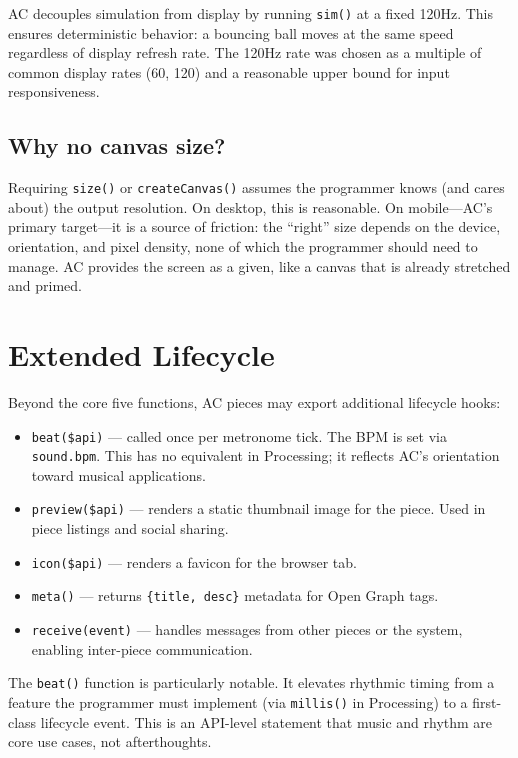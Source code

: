 \documentclass[10pt,letterpaper,twocolumn]{article}
\begin{document}
AC decouples simulation from display by running \texttt{sim()} at a fixed 120Hz. This ensures deterministic behavior: a bouncing ball moves at the same speed regardless of display refresh rate. The 120Hz rate was chosen as a multiple of common display rates (60, 120) and a reasonable upper bound for input responsiveness.

\subsection{Why no canvas size?}

Requiring \texttt{size()} or \texttt{createCanvas()} assumes the programmer knows (and cares about) the output resolution. On desktop, this is reasonable. On mobile---AC's primary target---it is a source of friction: the ``right'' size depends on the device, orientation, and pixel density, none of which the programmer should need to manage. AC provides the screen as a given, like a canvas that is already stretched and primed.


\section{Extended Lifecycle}
\label{sec:extended}

Beyond the core five functions, AC pieces may export additional lifecycle hooks:

\begin{itemize}
  \item \texttt{beat(\$api)} --- called once per metronome tick. The BPM is set via \texttt{sound.bpm}. This has no equivalent in Processing; it reflects AC's orientation toward musical applications.
  \item \texttt{preview(\$api)} --- renders a static thumbnail image for the piece. Used in piece listings and social sharing.
  \item \texttt{icon(\$api)} --- renders a favicon for the browser tab.
  \item \texttt{meta()} --- returns \texttt{\{title, desc\}} metadata for Open Graph tags.
  \item \texttt{receive(event)} --- handles messages from other pieces or the system, enabling inter-piece communication.
\end{itemize}

The \texttt{beat()} function is particularly notable. It elevates rhythmic timing from a feature the programmer must implement (via \texttt{millis()} in Processing) to a first-class lifecycle event. This is an API-level statement that music and rhythm are core use cases, not afterthoughts.
\end{document}
